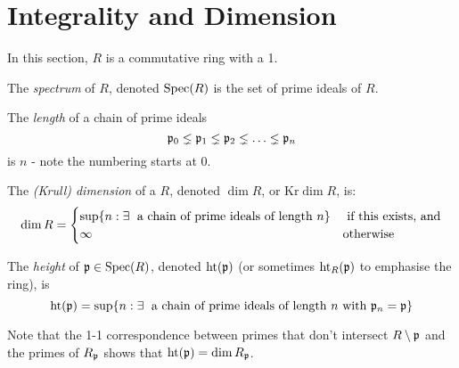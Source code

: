 \documentclass[10pt,a4paper]{article}
\begin{document}
\section{Integrality and Dimension}
In this section, $R$ is a commutative ring with a 1.
\begin{definition}
  The \emph{spectrum} of $R$, denoted $\operatorname{Spec}(R)$ is the set of prime ideals of $R$.
\end{definition}
\begin{definition}
  The \emph{length} of  a chain of prime ideals
  \[\mathfrak{p}_0 \lneq \mathfrak{p}_1 \lneq \mathfrak{p}_2 \lneq \ldots \lneq \mathfrak{p}_n\]
  is $n$ - note the numbering starts at 0.
\end{definition}
\begin{definition}
  The \emph{(Krull) dimension} of a $R$, denoted $\dim R$, or $\text{Kr} \dim R$, is:
  \[\dim R = \begin{cases} \sup\{n: \exists \text{ a chain of prime ideals of length $n$}\}& \text{ if this exists, and}\\ \infty &\ow\end{cases}\]
\end{definition}
\begin{definition}
  The \emph{height} of $\mathfrak{p}\in\operatorname{Spec}(R)$, denoted $\operatorname{ht}(\mathfrak{p})$ (or sometimes $\operatorname{ht}_R(\mathfrak{p})$ to emphasise the ring), is
  \[\height(\p) = \sup\{n : \exists \text{ a chain of prime ideals of length $n$ with } \p_n =\p\}\]
\end{definition}
Note that the 1-1 correspondence between primes that don't intersect $R \setminus \mathfrak{p}$ and the primes of $R_{\mathfrak{p}}$ shows that $\operatorname{ht}(\mathfrak{p}) = \dim R_{\mathfrak{p}}$.
\end{document}
